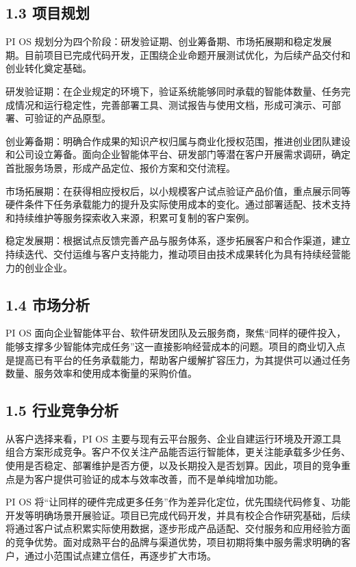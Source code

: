 \subsection{1.3 项目规划}\label{ux9879ux76eeux89c4ux5212}

PI OS 规划分为四个阶段：研发验证期、创业筹备期、市场拓展期和稳定发展期。目前项目已完成代码开发，正围绕企业命题开展测试优化，为后续产品交付和创业转化奠定基础。

研发验证期：在企业规定的环境下，验证系统能够同时承载的智能体数量、任务完成情况和运行稳定性，完善部署工具、测试报告与使用文档，形成可演示、可部署、可验证的产品原型。

创业筹备期：明确合作成果的知识产权归属与商业化授权范围，推进创业团队建设和公司设立筹备。面向企业智能体平台、研发部门等潜在客户开展需求调研，确定首批服务场景，形成产品定位、报价方案和交付流程。

市场拓展期：在获得相应授权后，以小规模客户试点验证产品价值，重点展示同等硬件条件下任务承载能力的提升及实际使用成本的变化。通过部署适配、技术支持和持续维护等服务探索收入来源，积累可复制的客户案例。

稳定发展期：根据试点反馈完善产品与服务体系，逐步拓展客户和合作渠道，建立持续迭代、交付运维与客户支持能力，推动项目由技术成果转化为具有持续经营能力的创业企业。

\subsection{1.4 市场分析}\label{ux5e02ux573aux5206ux6790}

PI OS 面向企业智能体平台、软件研发团队及云服务商，聚焦``同样的硬件投入，能够支撑多少智能体完成任务''这一直接影响经营成本的问题。项目的商业切入点是提高已有平台的任务承载能力，帮助客户缓解扩容压力，为其提供可以通过任务数量、服务效率和使用成本衡量的采购价值。

\subsection{1.5 行业竞争分析}\label{ux884cux4e1aux7adeux4e89ux5206ux6790}

从客户选择来看，PI OS 主要与现有云平台服务、企业自建运行环境及开源工具组合方案形成竞争。客户不仅关注产品能否运行智能体，更关注能承载多少任务、使用是否稳定、部署维护是否方便，以及长期投入是否划算。因此，项目的竞争重点是为客户提供可验证的成本与效率改善，而不是单纯增加功能。

PI OS 将``让同样的硬件完成更多任务''作为差异化定位，优先围绕代码修复、功能开发等明确场景开展验证。项目已完成代码开发，并具有校企合作研究基础，后续将通过客户试点积累实际使用数据，逐步形成产品适配、交付服务和应用经验方面的竞争优势。面对成熟平台的品牌与渠道优势，项目初期将集中服务需求明确的客户，通过小范围试点建立信任，再逐步扩大市场。

